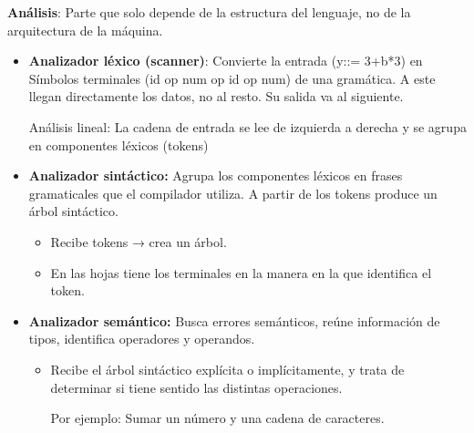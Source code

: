 \documentclass[12pt, twoside, openright]{report} %
\begin{document}
\textbf{Análisis}: Parte que solo depende de la estructura del lenguaje, no de la arquitectura de la máquina.
\begin{itemize}
  \item \textbf{Analizador léxico (scanner)}: Convierte la entrada (y::= 3+b*3) en Símbolos terminales (id op num op id op num) de una gramática. A este llegan directamente los datos, no al resto. Su salida va al siguiente.

    Análisis lineal: La cadena de entrada se lee de izquierda a derecha y se agrupa en componentes léxicos (tokens)
    
    \begin{figure}[H]
      {\def\svgwidth{.8\textwidth}
      }
    \end{figure}
    
  \item \textbf{Analizador sintáctico:} Agrupa los componentes léxicos en frases
    gramaticales que el compilador utiliza. A partir de los tokens produce
    un árbol sintáctico.
    
    \begin{itemize}
    \item
      Recibe tokens → crea un árbol.
    \item
      En las hojas tiene los terminales en la manera en la que identifica el
      token.
    \end{itemize}
    
    \begin{figure}[H]
      {\def\svgwidth{.8\textwidth}
      }
    \end{figure}
  \pagebreak
  \item \textbf{Analizador semántico:} Busca errores semánticos, reúne información de tipos, identifica operadores y operandos.
  
    \begin{itemize}
    \item
      Recibe el árbol sintáctico explícita o implícitamente, y trata de
      determinar si tiene sentido las distintas operaciones.
    
      Por ejemplo: Sumar un número y una cadena de caracteres.
    \end{itemize}
\end{itemize}
\end{document}
